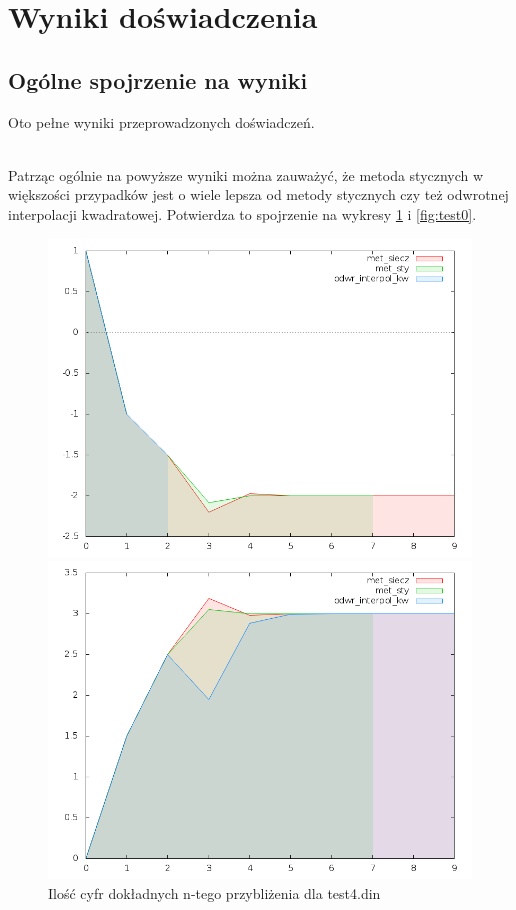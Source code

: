 \documentclass[11pt,wide]{mwart}
\begin{document}
\section{Wyniki doświadczenia}
\subsection{Ogólne spojrzenie na wyniki}
Oto pełne wyniki przeprowadzonych doświadczeń.

\\\indent Patrząc ogólnie na powyższe wyniki można zauważyć, że metoda stycznych w większości przypadków jest o wiele lepsza od metody stycznych czy też odwrotnej interpolacji kwadratowej. Potwierdza to spojrzenie na wykresy \ref{fig:test4} i \ref{fig:test0}.
\begin{figure}[ht]
  \begin{minipage}[b]{0.45\linewidth}
    \centering
    \includegraphics[width=\textwidth]{../wykresy/test4.png}
    \caption{Ilość cyfr dokładnych n-tego przybliżenia dla test4.din}
    \label{fig:test4}
  \end{minipage}
  \hspace{0.5cm}
  \begin{minipage}[b]{0.45\linewidth}
    \centering
    \includegraphics[width=\textwidth]{../wykresy/test0.png}

\end{minipage}
\end{figure}
\end{document}
